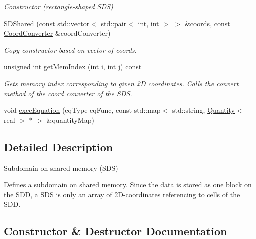 \begin{DoxyCompactItemize}
\begin{DoxyCompactList}\small\item\em Constructor (rectangle-\/shaped S\+DS) \end{DoxyCompactList}\item 
\mbox{\label{classSDShared_a144fb5b0439010b5ba9db386a5b1c636}} 
\hyperlink{classSDShared_a144fb5b0439010b5ba9db386a5b1c636}{S\+D\+Shared} (const std\+::vector$<$ std\+::pair$<$ int, int $>$ $>$ \&coords, const \hyperlink{classCoordConverter}{Coord\+Converter} \&coord\+Converter)
\begin{DoxyCompactList}\small\item\em Copy constructor based on vector of coords. \end{DoxyCompactList}\item 
unsigned int \hyperlink{classSDShared_a2418c837fb19a0997ca61e4b8bd65597}{get\+Mem\+Index} (int i, int j) const
\begin{DoxyCompactList}\small\item\em Gets memory index corresponding to given 2D coordinates. Calls the convert method of the coord converter of the S\+DS. \end{DoxyCompactList}\item 
void \hyperlink{classSDShared_afc27ac7db0bcb8177f54bb5a682606c1}{exec\+Equation} (eq\+Type eq\+Func, const std\+::map$<$ std\+::string, \hyperlink{classQuantity}{Quantity}$<$ real $>$ $\ast$ $>$ \&quantity\+Map)
\end{DoxyCompactItemize}


\subsection{Detailed Description}
Subdomain on shared memory (S\+DS) 

Defines a subdomain on shared memory. Since the data is stored as one block on the S\+DD, a S\+DS is only an array of 2\+D-\/coordinates referencing to cells of the S\+DD. 

\subsection{Constructor \& Destructor Documentation}
\mbox{\label{classSDShared_a51004922c9fbb3f46dd5533dd95a3c12}} 
